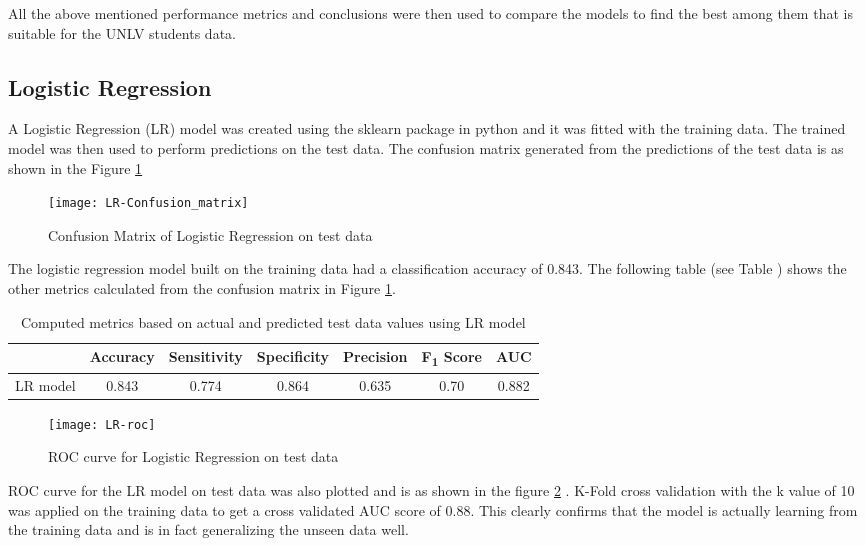 \documentclass[11pt,openright]{report}
\begin{document}
All the above mentioned performance metrics and conclusions were then used to compare the models to find the best among them that is suitable for the UNLV students data.

\subsection {Logistic Regression}
A Logistic Regression (LR) model was created using the sklearn package in python and it was fitted with the training data. The trained model was then used to perform predictions on the test data. The confusion matrix generated from the predictions of the test data is as shown in the Figure \ref{fig:lr_confusion_matrix}

  \begin{figure}
	\centering
	\texttt{[image: LR-Confusion\_matrix]}
	\caption{Confusion Matrix of Logistic Regression on test data}
	\label{fig:lr_confusion_matrix}
\end{figure} 

The logistic regression model built on the training data had a classification accuracy of 0.843. The following table (see Table ) shows the other metrics calculated from the confusion matrix in Figure \ref{fig:lr_confusion_matrix}. 
\begin{table}
	\renewcommand{\arraystretch}{1.3}
	\caption{Computed metrics based on actual and predicted test data values using LR model}
	\label{table:lr-metrics_db}
	\centering
	\begin{tabular}{|c|c|c|c|c|c|c|}
    \hline
  	 & \bfseries Accuracy & \bfseries Sensitivity & \bfseries Specificity & \bfseries Precision & \bfseries F\textsubscript{1} Score  & \bfseries AUC\\  
    \hline
	LR model & 0.843 & 0.774 & 0.864 & 0.635 & 0.70 & 0.882 \\ \hline
	\end{tabular} 
\end{table}


 \begin{figure}[!htbp]
	\centering
	\texttt{[image: LR-roc]}
	\caption{ROC curve for Logistic Regression on test data}
	\label{fig:lr_roc}
\end{figure} 

ROC curve for the LR model on test data was also plotted  and is as shown in the figure \ref{fig:lr_roc} . K-Fold cross validation with the k value of 10 was applied on the training data to get a cross validated AUC score of 0.88. This clearly confirms that the model is actually learning from the training data and is in fact generalizing the unseen data well.
\end{document}
